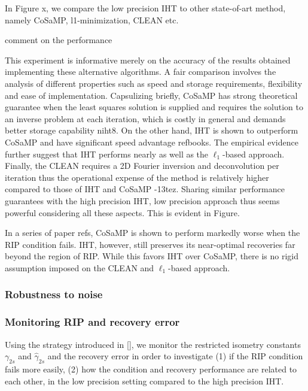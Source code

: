 \documentclass{article}
\begin{document}
In Figure x, we compare the low precision IHT to other state-of-art method, namely CoSaMP, l1-minimization, CLEAN etc. 

comment on the performance




This experiment is informative merely on the accuracy of the results obtained implementing these alternative algorithms. A fair comparison involves the analysis of different properties such as speed and storage requirements, flexibility and ease of implementation. Capsulizing briefly, CoSaMP has strong theoretical guarantee when the least squares solution is supplied and requires the solution to an inverse problem at each iteration, which is costly in general and demands better storage capability niht8. On the other hand, IHT is shown to outperform CoSaMP and have significant speed advantage refbooks. The empirical evidence further suggest that IHT performs nearly as well as the $\ell_1$-based approach. Finally, the CLEAN requires a 2D Fourier inversion and deconvolution per iteration thus the operational expense of the method is relatively higher compared to those of IHT and CoSaMP -13tez. Sharing similar performance guarantees with the high precision IHT, low precision approach thus seems powerful considering all these aspects. This is evident in Figure.

 In a series of paper refs, CoSaMP is shown to perform markedly worse when the RIP condition fails. IHT, however, still preserves its near-optimal recoveries far beyond the region of RIP. While this favors IHT over CoSaMP, there is no rigid assumption imposed on the CLEAN and $\ell_1$-based approach. 



\subsubsection{Robustness to noise}

\subsubsection{Monitoring RIP and recovery error}
Using the strategy introduced in [], we monitor the restricted isometry constants $\gamma_{2s}$ and $\hat{\gamma}_{2s}$ and the recovery error in order to investigate (1) if the RIP condition fails more easily, (2) how the condition and recovery performance are related to each other, in the low precision setting compared to the high precision IHT.
\end{document}
